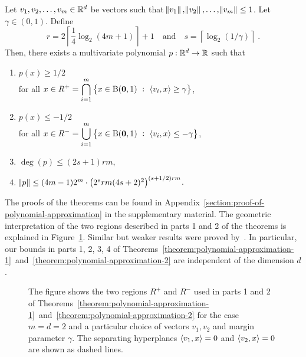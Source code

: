\begin{theorem}
\label{theorem:polynomial-approximation-2}
Let $v_1, v_2, \dots, v_m \in \mathbb{R}^d$ be vectors such that $\norm{v_1},
\norm{v_2}, \dots, \norm{v_m} \le 1$. Let $\gamma \in (0,1)$.
Define
$$
r = 2 \left\lceil \frac{1}{4} \log_2(4m + 1) \right\rceil + 1 \quad \text{and} \quad s = \left \lceil \log_2(1/\gamma) \right \rceil \; .
$$
Then, there exists a multivariate polynomial $p:\mathbb{R}^d \to \mathbb{R}$ such that
\begin{enumerate}
\item $\displaystyle p(x) \ge 1/2$ \\
for all $\displaystyle x \in R^+ = \bigcap_{i=1}^m \left\{ x \in \operatorname{B}(\mathbf{0},1) ~:~ \left\langle v_i, x \right\rangle \ge \gamma \right\}$,

\item $\displaystyle p(x) \le - 1/2$ \\
for all $\displaystyle x \in R^- = \bigcup_{i=1}^m \left\{ x \in \operatorname{B}(\mathbf{0},1) ~:~ \left\langle v_i, x \right\rangle \le - \gamma \right\}$,

\item $\deg(p) \le (2s+1) rm$,
\item $\norm{p} \le (4m-1) 2^m \cdot \left(2^s rm (4s+2)^2 \right)^{(s+1/2)rm}$.
\end{enumerate}
\end{theorem}

The proofs of the theorems can be found in
Appendix~\ref{section:proof-of-polynomial-approximation} in the supplementary
material. The geometric interpretation of the two regions described in parts 1
and 2 of the theorems is explained in Figure~\ref{figure:pizza-slice}. Similar
but weaker results were proved by~\citet{Klivans-Servedio-2008}. In particular,
our bounds in parts 1, 2, 3, 4 of
Theorems~\ref{theorem:polynomial-approximation-1}~and~\ref{theorem:polynomial-approximation-2}
are independent of the dimension $d$.

\begin{figure}
\begin{center}
 \scalebox{.65}{}
\end{center}
\caption[]{The figure shows the two regions $R^+$ and $R^-$ used in parts 1 and
2 of
Theorems~\ref{theorem:polynomial-approximation-1}~and~\ref{theorem:polynomial-approximation-2}
for the case $m=d=2$ and a particular choice of vectors $v_1, v_2$ and margin
parameter $\gamma$. The separating hyperplanes $\left\langle v_1, x \right\rangle = 0$ and
$\left\langle v_2, x \right\rangle = 0$ are shown as dashed lines.}
\label{figure:pizza-slice}
\end{figure}

